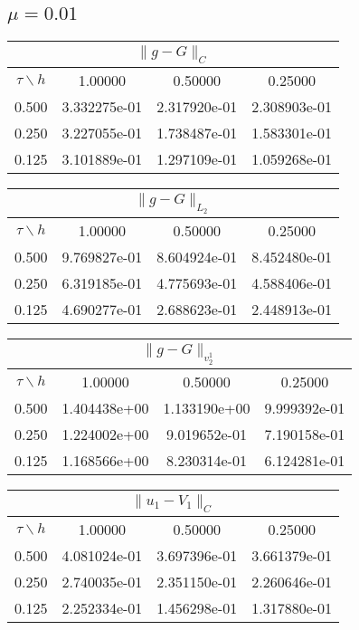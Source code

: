\subsection{$\mu=0.01$}       
\begin{center}
\begin{tabular}{||c|c|c|c||}
\hline
\hline
\multicolumn{4}{||c||}{$\|g-G\| _{C}$}\\ 
\hline
\hline
$\tau \backslash h$ & 1.00000 & 0.50000 & 0.25000\\ 
\hline 
0.500& 3.332275e-01 &2.317920e-01 &2.308903e-01 \\ 
\hline
0.250& 3.227055e-01 &1.738487e-01 &1.583301e-01 \\ 
\hline
0.125& 3.101889e-01 &1.297109e-01 &1.059268e-01 \\ 
\hline
\hline
\hline
\end{tabular}
\end{center}
\begin{center}
\begin{tabular}{||c|c|c|c||}
\hline
\hline
\multicolumn{4}{||c||}{$\|g-G\| _{L_2}$}\\ 
\hline
\hline
$\tau \backslash h$ & 1.00000 & 0.50000 & 0.25000\\ 
\hline 
0.500& 9.769827e-01 &8.604924e-01 &8.452480e-01 \\ 
\hline
0.250& 6.319185e-01 &4.775693e-01 &4.588406e-01 \\ 
\hline
0.125& 4.690277e-01 &2.688623e-01 &2.448913e-01 \\ 
\hline
\hline
\end{tabular}
\end{center}
\begin{center}
\begin{tabular}{||c|c|c|c||}
\hline
\hline
\multicolumn{4}{||c||}{$\|g-G\| _{v_2^1}$}\\ 
\hline
$\tau \backslash h$ & 1.00000 & 0.50000 & 0.25000\\ 
\hline
\hline 
0.500& 1.404438e+00 &1.133190e+00 &9.999392e-01 \\ 
\hline
0.250& 1.224002e+00 &9.019652e-01 &7.190158e-01 \\ 
\hline
0.125& 1.168566e+00 &8.230314e-01 &6.124281e-01 \\ 
\hline
\hline
\end{tabular}
\end{center}
\begin{center}
\begin{tabular}{||c|c|c|c||}
\hline
\hline
\multicolumn{4}{||c||}{$\|u_1-V_1\| _{C}$}\\ 
\hline
\hline
$\tau \backslash h$ & 1.00000 & 0.50000 & 0.25000\\ 
\hline 
0.500& 4.081024e-01 &3.697396e-01 &3.661379e-01 \\ 
\hline
0.250& 2.740035e-01 &2.351150e-01 &2.260646e-01 \\ 
\hline
0.125& 2.252334e-01 &1.456298e-01 &1.317880e-01 \\ 
\hline
\hline
\end{tabular}
\end{center}
